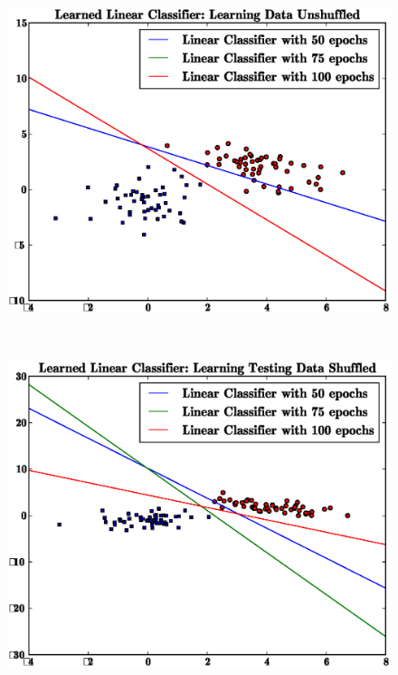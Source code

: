 \documentclass[letterpaper,10pt,titlepage]{article}
\begin{document}
\begin{figure}[th!]
\centering
\includegraphics[width=5in]{unshuffled.eps} 
\end{figure} 
\\[5mm]
\pagebreak
\begin{figure}[th!]
\centering
\includegraphics[width=5in]{test_data_shuffled.eps} 
\end{figure} 
\pagebreak
\pagebreak
\end{document}
